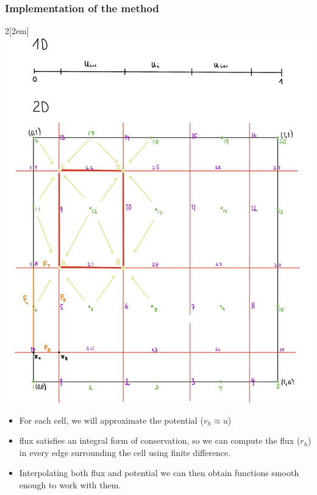 \documentclass[t]{beamer}
\begin{document}
\begin{frame}
\frametitle{Implementation of the method}
\begin{multicols}{2}[\columnsep2em] 
\includegraphics[width=\linewidth]{square.jpg}
\columnbreak
\begin{itemize}
\item For each cell, we will approximate the potential ($v_h \approx u$)
\item flux satisfies an integral form of conservation, so we can compute the flux ($r_h$) in every edge surrounding the cell using finite difference.
\item Interpolating both flux and potential we can then obtain functions smooth enough to work with them. 
\end{itemize}

\end{multicols}

\end{frame}
\end{document}
